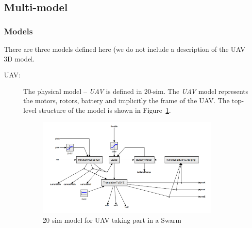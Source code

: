 \subsection{Multi-model}
\label{sec:uavswarm_into_mm}

\subsubsection{Models}
There are three models defined here (we do not include a description of the UAV 3D model.

\begin{description}
\item[UAV:] The physical model -- \emph{UAV} is defined in 20-sim. The \emph{UAV} model represents the motors, rotors, battery and implicitly the frame of the UAV. The top-level structure of the model is shown in Figure~\ref{fig:swarm-20-sim}.

\begin{figure}[htbp]
\begin{center}
\includegraphics[width=0.9\textwidth]{uavswarm/uav-20-sim-uav}
\caption{20-sim model for UAV taking part in a Swarm}
\label{fig:swarm-20-sim}
\end{center}
\end{figure}


\end{description}
